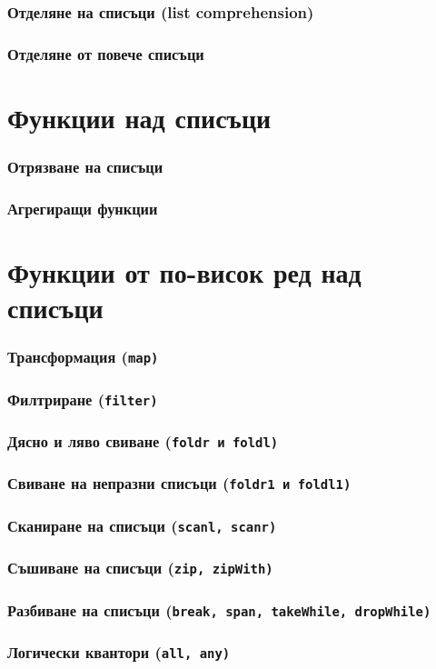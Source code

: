 \documentclass{beamer}
\begin{document}
\begin{frame}
  \frametitle{Отделяне на списъци (list comprehension)}
  
\end{frame}

\begin{frame}
  \frametitle{Отделяне от повече списъци}
  
\end{frame}

\section{Функции над списъци}

\begin{frame}
  \frametitle{Отрязване на списъци}
\end{frame}

\begin{frame}
  \frametitle{Агрегиращи функции}
\end{frame}

\section{Функции от по-висок ред над списъци}

\begin{frame}
  \frametitle{Трансформация (\tt{map})}
  
\end{frame}

\begin{frame}
  \frametitle{Филтриране (\tt{filter})}
  
\end{frame}

\begin{frame}
  \frametitle{Дясно и ляво свиване (\tt{foldr} и \tt{foldl})}
  
\end{frame}

\begin{frame}
  \frametitle{Свиване на непразни списъци (\tt{foldr1} и \tt{foldl1})}
  
\end{frame}

\begin{frame}
  \frametitle{Сканиране на списъци (\tt{scanl}, \tt{scanr})}
  
\end{frame}


\begin{frame}
  \frametitle{Съшиване на списъци (\tt{zip}, \tt{zipWith})}
  
\end{frame}

\begin{frame}
  \frametitle{Разбиване на списъци (\tt{break}, \tt{span}, \tt{takeWhile}, \tt{dropWhile})} 
  
\end{frame}

\begin{frame}
  \frametitle{Логически квантори (\tt{all}, \tt{any})}
  
\end{frame}
\end{document}
